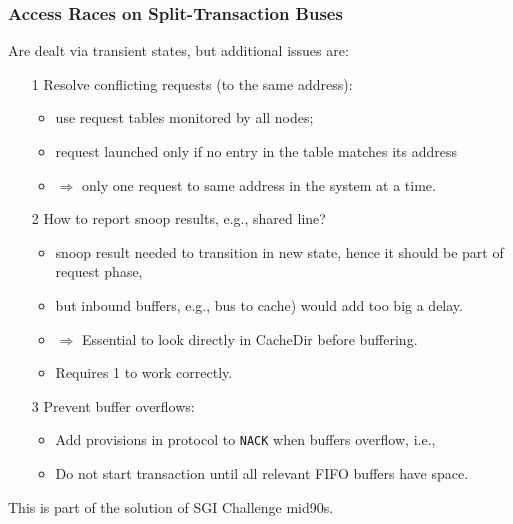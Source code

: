 \documentclass{beamer}
\renewcommand{\emph}[1]{\textcolor{structure}{#1}}
\newcommand{\emp}[1]{\textcolor{DikuRed}{ #1}}
\begin{document}
\begin{frame}[fragile,t]
\frametitle{Access Races on Split-Transaction Buses}

Are dealt via transient states, but additional issues are:
\begin{itemize}
    \item[1] \emp{Resolve conflicting requests (to the same address):}\\
            \begin{itemize} 
                \item use request tables monitored by all nodes;
                \item request launched only if no entry in the table matches its address 
                \item $\Rightarrow$ only one request to same address in the system at a time.
            \end{itemize} 
    \item[2] \emp{How to report snoop results, e.g., shared line?}
            \begin{itemize} 
                \item snoop result needed to transition in new state, 
                        hence it should be part of request phase,
                \item but inbound buffers, e.g., bus to cache) would add too big a delay. 
                \item $\Rightarrow$ Essential to look directly in CacheDir before buffering.
                \item Requires \emph{1} to work correctly.
            \end{itemize} 
    \item[3] \emp{Prevent buffer overflows:}
            \begin{itemize} 
                \item Add provisions in protocol to {\tt NACK} when buffers overflow, i.e.,
                \item Do not start transaction until all relevant FIFO buffers have space. 
            \end{itemize}             
\end{itemize}

This is part of the solution of SGI Challenge mid90s.

\end{frame}
\end{document}
